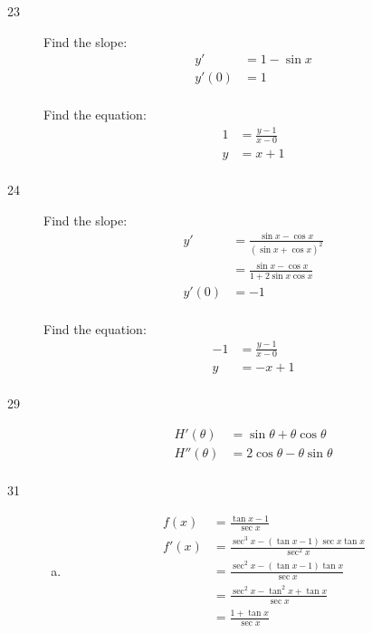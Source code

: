 \documentclass[letterpaper, landscape]{exam}
\begin{document}
\begin{description}
    \item[23] 
      Find the slope:
      \begin{align*}
        y'    & = 1 - \sin x \\
        y'(0) & = 1 \\
      \end{align*}

      Find the equation:
      \begin{align*}
        1     & = \frac{y - 1}{x - 0} \\
        y     & = x + 1 \\
      \end{align*}

    \item[24] 
      Find the slope:
      \begin{align*}
        y'    & = \frac{\sin x - \cos x}{(\sin x + \cos x)^2} \\
              & = \frac{\sin x - \cos x}{1 + 2 \sin x \cos x} \\
        y'(0) & = -1 \\
      \end{align*}

      Find the equation:
      \begin{align*}
        -1 & = \frac{y - 1}{x - 0} \\
        y  & = -x + 1 \\
      \end{align*}

    \item[29] 
      \begin{align*}
        H'(\theta)  & = \boxed{ \sin \theta + \theta \cos \theta } \\
        H''(\theta) & = \boxed{ 2 \cos \theta - \theta \sin \theta } \\
      \end{align*}

    \item[31] 
      \begin{enumerate}[(a)]
        \item 
          \begin{align*}
            f(x)  & = \frac{\tan x - 1}{\sec x} \\
            f'(x) & = \frac{\sec^3 x - (\tan x - 1) \sec x \tan x}{\sec^2 x} \\
                  & = \frac{\sec^2 x - (\tan x - 1) \tan x}{\sec x} \\
                  & = \frac{\sec^2 x - \tan^2 x + \tan x}{\sec x} \\
                  & = \frac{1 + \tan x}{\sec x} \\
          \end{align*}


\end{enumerate}
\end{description}
\end{document}
